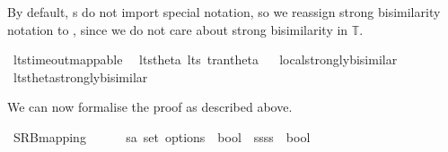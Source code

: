 \begin{isabellebody}
\begin{isamarkuptext}
By default, s do not import special notation, so we reassign strong bisimilarity notation \isa{{\isasymleftrightarrow}} to , since we do not care about strong bisimilarity in $\mathbb{T}$.%
\end{isamarkuptext}\isamarkuptrue%
\isamarkupfalse%
\ lts{\isacharunderscore}{\kern0pt}timeout{\isacharunderscore}{\kern0pt}mappable\ \isanewline
\isanewline
{}\isamarkupfalse%
\ lts{\isacharunderscore}{\kern0pt}theta{\isacharcolon}{\kern0pt}\ lts\ tran{\isacharunderscore}{\kern0pt}theta%
\isadelimproof
\ %
\endisadelimproof
%
\isatagproof
\isacommand{{\isachardot}{\kern0pt}}\isamarkupfalse%
%
\endisatagproof
{\isafoldproof}%
%
\isadelimproof
%
\endisadelimproof
\isanewline
{}\isamarkupfalse%
\ local{\isachardot}{\kern0pt}strongly{\isacharunderscore}{\kern0pt}bisimilar\ {\isacharparenleft}{\kern0pt}{\isacartoucheopen}{\isacharunderscore}{\kern0pt}\ {\isasymleftrightarrow}\ {\isacharunderscore}{\kern0pt}{\isacartoucheclose}\ {\isacharbrackleft}{\kern0pt}{}{}{\isacharcomma}{\kern0pt}\ {}{}{\isacharbrackright}{\kern0pt}\ {}{}{\isacharparenright}{\kern0pt}\isanewline
{}\isamarkupfalse%
\ lts{\isacharunderscore}{\kern0pt}theta{\isachardot}{\kern0pt}strongly{\isacharunderscore}{\kern0pt}bisimilar\ {\isacharparenleft}{\kern0pt}{\isacartoucheopen}{\isacharunderscore}{\kern0pt}\ {\isasymleftrightarrow}\ {\isacharunderscore}{\kern0pt}{\isacartoucheclose}\ {\isacharbrackleft}{\kern0pt}{}{}{\isacharcomma}{\kern0pt}\ {}{}{\isacharbrackright}{\kern0pt}\ {}{}{\isacharparenright}{\kern0pt}%
\begin{isamarkuptext}%
We can now formalise the proof as described above.%
\end{isamarkuptext}\isamarkuptrue%
%
\isadelimdocument
%
\endisadelimdocument
%
\isatagdocument
%
\isamarkuptrue%
%
\endisatagdocument
{\isafolddocument}%
%
\isadelimdocument
%
\endisadelimdocument
{}\isamarkupfalse%
\ SRB{\isacharunderscore}{\kern0pt}mapping\ %
\ \isanewline
\ \ {\isacharcolon}{\kern0pt}{\isacharcolon}{\kern0pt}\ {\isacartoucheopen}{\isacharparenleft}{\kern0pt}{\isacharprime}{\kern0pt}s{\isasymRightarrow}{\isacharprime}{\kern0pt}a\ set\ option{\isasymRightarrow}{\isacharprime}{\kern0pt}s\ {\isasymRightarrow}\ bool{\isacharparenright}{\kern0pt}\ {\isasymRightarrow}\ {\isacharparenleft}{\kern0pt}{\isacharprime}{\kern0pt}ss{\isasymRightarrow}{\isacharprime}{\kern0pt}ss\ {\isasymRightarrow}\ bool{\isacharparenright}{\kern0pt}{\isacartoucheclose}\isanewline

\end{isabellebody}
